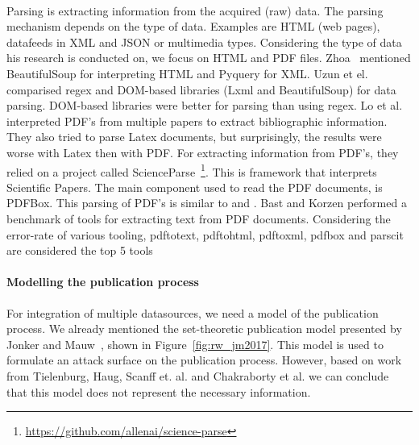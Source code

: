 \documentclass{ou-report}
\begin{document}
\ \\
Parsing is extracting information from the acquired (raw) data. The parsing 
mechanism depends on the type of data.  Examples are HTML (web pages), datafeeds
in XML and JSON or multimedia types. Considering the type of data his research 
is conducted on, we focus on HTML and PDF files.
Zhoa~\cite{zhao2017} mentioned BeautifulSoup for interpreting HTML and Pyquery
for XML. Uzun et el.~\cite{uzun2018comparison} comparised regex and DOM-based 
libraries (Lxml and BeautifulSoup) for data parsing. DOM-based libraries were 
better for parsing than using regex.
Lo et al. interpreted PDF's from multiple papers \cite{lo-etal-2020-s2orc} to 
extract bibliographic information. They also tried to parse Latex documents, but
surprisingly, the results were worse with Latex then with PDF. For extracting 
information from PDF's, they relied on a project called
ScienceParse~\footnote{\url{https://github.com/allenai/science-parse}}. This is 
framework that interprets Scientific Papers. The main component used to read the
PDF documents, is PDFBox.
This parsing of PDF's is similar to \cite{niu2014realization} and \cite{BK2017}.
Bast and Korzen performed a benchmark of tools for extracting text from PDF 
documents. Considering the error-rate of various tooling, pdftotext, pdftohtml, 
pdftoxml, pdfbox and parscit are considered the top 5 tools~\cite{BK2017}






\paragraph{Modelling the publication process} \label{rw_publication_process}
For integration of multiple datasources, we need a model of the publication 
process.
We already mentioned the set-theoretic publication model presented by 
Jonker and Mauw~\cite{JM2017}, shown in Figure~\ref{fig:rw_jm2017}. This model
is used to formulate an attack surface on the publication process. However, 
based on work from Tielenburg, Haug, Scanff et. al. and Chakraborty et al. we 
can conclude that this model does not represent the necessary information.
\end{document}
